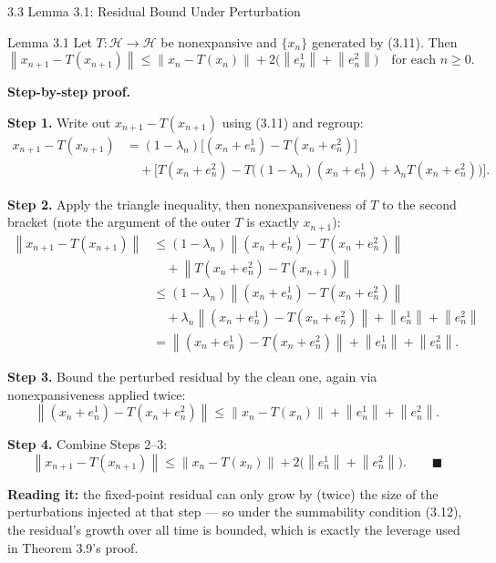 \documentclass[aspectratio=169,10pt]{beamer}
\newcommand{\cH}{\mathcal{H}}
\newcommand{\norm}[1]{\left\|#1\right\|}
\begin{document}
\begin{frame}[allowframebreaks]{3.3 Lemma 3.1: Residual Bound Under Perturbation}

  \begin{block}{Lemma 3.1}
    Let $T:\cH\to\cH$ be nonexpansive and $\{x_n\}$ generated by (3.11).
    Then
    $$\norm{x_{n+1}-T(x_{n+1})}\le\norm{x_n-T(x_n)}+2\bigl(\norm{e_n^1}+\norm{e_n^2}\bigr)
    \quad\text{for each } n\ge0.$$
  \end{block}

  \textbf{Step-by-step proof.}

  \textbf{Step 1.} Write out $x_{n+1}-T(x_{n+1})$ using (3.11) and
  regroup:
  \begin{align*}
    x_{n+1}-T(x_{n+1})
    &=(1-\lambda_n)\bigl[(x_n+e_n^1)-T(x_n+e_n^2)\bigr]\\
    &\quad+\bigl[T(x_n+e_n^2)-T\bigl((1-\lambda_n)(x_n+e_n^1)+\lambda_nT(x_n+e_n^2)\bigr)\bigr].
  \end{align*}

  \textbf{Step 2.} Apply the triangle inequality, then nonexpansiveness
  of $T$ to the second bracket (note the argument of the outer $T$ is
  exactly $x_{n+1}$):
  \begin{align*}
    \norm{x_{n+1}-T(x_{n+1})}
    &\le(1-\lambda_n)\norm{(x_n+e_n^1)-T(x_n+e_n^2)}\\
    &\quad+\norm{T(x_n+e_n^2)-T(x_{n+1})}\\
    &\le(1-\lambda_n)\norm{(x_n+e_n^1)-T(x_n+e_n^2)}\\
    &\quad+\lambda_n\norm{(x_n+e_n^1)-T(x_n+e_n^2)}+\norm{e_n^1}+\norm{e_n^2}\\
    &= \norm{(x_n+e_n^1)-T(x_n+e_n^2)}+\norm{e_n^1}+\norm{e_n^2}.
  \end{align*}

  \framebreak

  \textbf{Step 3.} Bound the perturbed residual by the clean one, again
  via nonexpansiveness applied twice:
  $$\norm{(x_n+e_n^1)-T(x_n+e_n^2)}
  \le\norm{x_n-T(x_n)}+\norm{e_n^1}+\norm{e_n^2}.$$

  \textbf{Step 4.} Combine Steps 2--3:
  $$\norm{x_{n+1}-T(x_{n+1})}\le\norm{x_n-T(x_n)}+2\bigl(\norm{e_n^1}+\norm{e_n^2}\bigr). \qquad\blacksquare$$

  \textbf{Reading it:} the fixed-point residual can only grow by (twice)
  the size of the perturbations injected at that step --- so under the
  summability condition (3.12), the residual's growth over all time is
  bounded, which is exactly the leverage used in Theorem 3.9's proof.
\end{frame}
\end{document}
